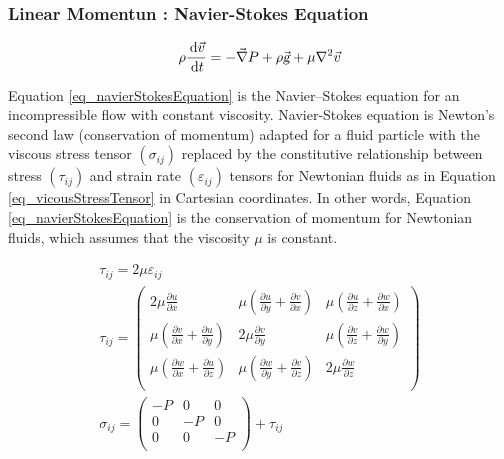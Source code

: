 \documentclass{article}
\newcommand{\ud}{\,\mathrm{d}}
\begin{document}
\subsubsection*{Linear Momentun : Navier-Stokes Equation}

\begin{equation}
\rho \frac{\ud \vec{v}}{\ud t} = - \vec{\nabla} P + \rho \vec{\textsl{g}} + \mu \nabla^2 \vec{v}
\label{eq_navierStokesEquation}
\end{equation}

Equation \ref{eq_navierStokesEquation} is the Navier–Stokes equation for an incompressible flow with constant viscosity. Navier-Stokes equation is Newton's second law (conservation of momentum) adapted for a fluid particle with the viscous stress tensor $(\sigma_{ij})$ replaced by the constitutive relationship between stress $(\tau_{ij})$ and strain rate $(\varepsilon_{ij})$ tensors for Newtonian fluids as in Equation \ref{eq_vicousStressTensor} in Cartesian coordinates. In other words, Equation \ref{eq_navierStokesEquation} is the conservation of momentum for Newtonian fluids, which assumes that the viscosity $\mu$ is constant.

\begin{equation}
\begin{array}{c}
    \tau_{ij} = 2 \mu \varepsilon_{ij} \\
    \tau_{ij} = \left( 
        \begin{matrix}
            \displaystyle 2 \mu \frac{\partial u}{\partial x} &
            \displaystyle \mu \left( \frac{\partial u}{\partial y} + \frac{\partial v}{\partial x} \right) &
            \displaystyle \mu \left( \frac{\partial u}{\partial z} + \frac{\partial w}{\partial x} \right) \\
            
            \displaystyle \mu \left( \frac{\partial v}{\partial x} + \frac{\partial u}{\partial y} \right) &
            \displaystyle 2 \mu \frac{\partial v}{\partial y} &
            \displaystyle \mu \left( \frac{\partial v}{\partial z} + \frac{\partial w}{\partial y} \right) \\
            
            \displaystyle \mu \left( \frac{\partial w}{\partial x} + \frac{\partial u}{\partial z} \right) &
            \displaystyle \mu \left( \frac{\partial w}{\partial y} + \frac{\partial v}{\partial z} \right) &
            \displaystyle 2 \mu \frac{\partial w}{\partial z} \\
        \end{matrix}
    \right) \\
    \sigma_{ij} = \left( 
        \begin{matrix}
            -P &  0 &  0 \\
             0 & -P &  0 \\
             0 &  0 & -P \\
        \end{matrix}
    \right) + \tau_{ij} \\
\end{array}
\label{eq_vicousStressTensor}
\end{equation}
\end{document}
